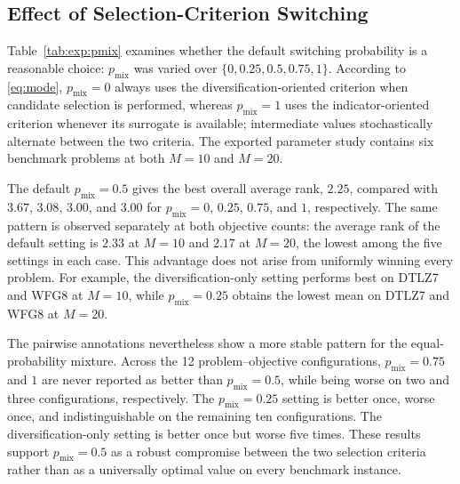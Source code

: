 \subsection{Effect of Selection-Criterion Switching}
\label{sec:exp:pmix}

Table~\ref{tab:exp:pmix} examines whether the default switching probability is a reasonable choice: $p_{\mathrm{mix}}$ was varied over $\{0,0.25,0.5,0.75,1\}$. According to \eqref{eq:mode}, $p_{\mathrm{mix}}=0$ always uses the diversification-oriented criterion when candidate selection is performed, whereas $p_{\mathrm{mix}}=1$ uses the indicator-oriented criterion whenever its surrogate is available; intermediate values stochastically alternate between the two criteria. The exported parameter study contains six benchmark problems at both $M=10$ and $M=20$.



The default $p_{\mathrm{mix}}=0.5$ gives the best overall average rank, $2.25$, compared with $3.67$, $3.08$, $3.00$, and $3.00$ for $p_{\mathrm{mix}}=0$, $0.25$, $0.75$, and $1$, respectively. The same pattern is observed separately at both objective counts: the average rank of the default setting is $2.33$ at $M=10$ and $2.17$ at $M=20$, the lowest among the five settings in each case. This advantage does not arise from uniformly winning every problem. For example, the diversification-only setting performs best on DTLZ7 and WFG8 at $M=10$, while $p_{\mathrm{mix}}=0.25$ obtains the lowest mean on DTLZ7 and WFG8 at $M=20$.

The pairwise annotations nevertheless show a more stable pattern for the equal-probability mixture. Across the 12 problem--objective configurations, $p_{\mathrm{mix}}=0.75$ and $1$ are never reported as better than $p_{\mathrm{mix}}=0.5$, while being worse on two and three configurations, respectively. The $p_{\mathrm{mix}}=0.25$ setting is better once, worse once, and indistinguishable on the remaining ten configurations. The diversification-only setting is better once but worse five times. These results support $p_{\mathrm{mix}}=0.5$ as a robust compromise between the two selection criteria rather than as a universally optimal value on every benchmark instance.
